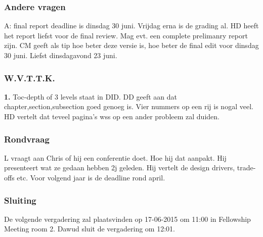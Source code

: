 \subsubsection{Andere vragen}
A: final report deadline is dinsdag 30 juni. Vrijdag erna is de grading al. HD heeft het report liefst voor de final review. Mag evt. een complete prelimanry report zijn. CM geeft als tip hoe beter deze versie is, hoe beter de final edit voor dinsdag 30 juni. Liefst dinsdagavond 23 juni.

\subsubsection{W.V.T.T.K.}

\textbf{1.} Toc-depth of 3 levels staat in DID. DD geeft aan dat chapter,section,subsection goed genoeg is. Vier nummers op een rij is nogal veel. HD vertelt dat teveel pagina's wss op een ander probleem zal duiden. 

\subsubsection{Rondvraag}
L vraagt aan Chris of hij een conferentie doet. Hoe hij dat aanpakt. Hij presenteert wat ze gedaan hebben 2j geleden. Hij vertelt de design drivers, trade-offs etc. Voor volgend jaar is de deadline rond april.

\subsubsection{Sluiting}
De volgende vergadering zal plaatsvinden op 17-06-2015 om 11:00 in Fellowship Meeting room 2.
\newline\newline
Dawud sluit de vergadering om 12:01.